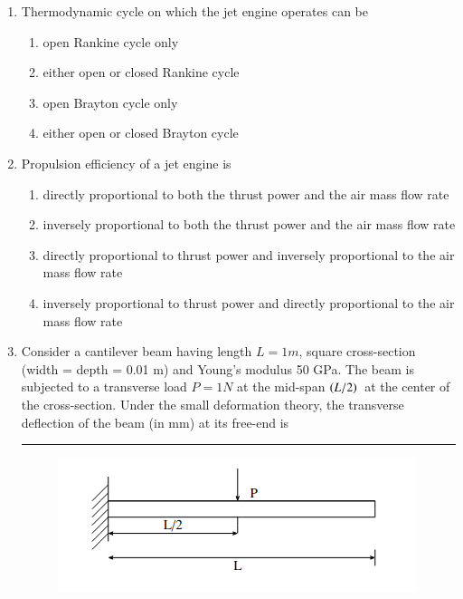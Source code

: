 \documentclass[journal]{IEEEtran}
\begin{document}
\begin{enumerate}[start=14]
\item Thermodynamic cycle on which the jet engine operates can be
 \begin{multicols}{2}
    \begin{enumerate}
        \item open Rankine cycle only
        \item either open or closed Rankine cycle
        \item open Brayton cycle only
        \item either open or closed Brayton cycle
    \end{enumerate}
\end{multicols}
\item Propulsion efficiency of a jet engine is
    \begin{enumerate}
        \item directly proportional to both the thrust power and the air mass flow rate
        \item inversely proportional to both the thrust power and the air mass flow rate
        \item directly proportional to thrust power and inversely proportional to the air mass flow rate
        \item inversely proportional to thrust power and directly proportional to the air mass flow rate
    \end{enumerate}


\item  Consider a cantilever beam having length $ L = 1m $, square cross-section\\ (width = depth = 0.01 m) and Young's modulus 50 GPa. The beam is subjected to a transverse load $ P = 1N $ at the mid-span $\left(L/2\right){}$ at the center of the cross-section. Under the small deformation theory, the transverse deflection of the beam (in mm) at its free-end is \rule{3cm}{0.15mm}



 \begin{figure}[h!]
   \centering
   \includegraphics[width=0.7\linewidth]{figs/figure1.png}
   \label{stemplot}
\end{figure}

\end{enumerate}
\end{document}
